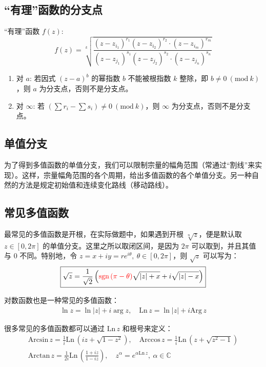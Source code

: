 \documentclass[UTF8]{report}
\def\Arg{\mathrm{Arg}\,}
\def\Ln{\mathrm{Ln\,}}
\def\Arccos{\mathrm{Arccos\,}}
\def\Arcsin{\mathrm{Arcsin\,}}
\def\Arctan{\mathrm{Arctan\,}}
\def\C{\mathbb{C}}
\theoremstyle{MyLineTheoremStyle} %
\theoremstyle{MyBlockTheoremStyle} %
\theoremstyle{MySubsubsectionStyle} %
\begin{document}
\subsection{“有理”函数的分支点}
“有理”函数 $f(z)$: 
\begin{equation}
f(z) = \sqrt[k]{
    \frac{
        (z - z_{i_1})^{r_1}(z - z_{i_2})^{r_2} \cdot (z - z_{i_m})^{r_m}
    }{
        (z - z_{j_1})^{s_1}(z - z_{j_2})^{s_2} \cdot (z - z_{j_n})^{s_n}
    }
}
\end{equation}

\begin{enumerate}
\item 对 $a$: 若因式 $(z - a)^b$ 的幂指数 $b$ {\color{red} 不能}被根指数 $k$ 整除，即 $ b \ne 0\ (\text{mod}\  k) $，则 $a$ 为分支点，否则不是分支点。
\item 对 $\infty$: 若 $(\sum r_i - \sum s_i) \ne 0\ (\text{mod}\  k)$，则 $\infty$ 为分支点，否则不是分支点。
\end{enumerate}

\subsection{单值分支}
为了得到多值函数的单值分支，我们可以限制宗量的幅角范围（常通过“割线”来实现）。这样，宗量幅角范围的各个周期，给出多值函数的各个单值分支。另一种自然的方法是规定初始值和连续变化路线（移动路线）。

\subsection{常见多值函数}
最常见的多值函数是开根，在实际做题中，如果遇到开根 $\sqrt[n]{z} $，便是默认取 $z \in [0, 2\pi]$ 的单值分支。这里之所以取闭区间，是因为 $2\pi$ 可以取到，并且其值与 $0$ 不同。特别地，令 $z = x + iy = re^{i \theta},\ \theta \in [0, 2\pi]$，则 $\sqrt{z}$ 可以写为：
\begin{equation}
\boxed{
    \sqrt{z} =  \frac{1}{\sqrt{2}} \left( {\color{red} \text{sgn\,}(\pi -\theta)} \sqrt{| z | + x} + i \sqrt{| z | - x}  \right)
}
\end{equation}

对数函数也是一种常见的多值函数：
\begin{gather}
    \ln z = \ln | z | + i\arg z,\quad
    \Ln z = \ln | z | + i\Arg z
\end{gather}

很多常见的多值函数都可以通过 $\Ln z$ 和根号来定义：
\begin{gather}
    \Arcsin z = \frac{1}{i}\Ln (iz + \sqrt{1-z^2} ),\quad
    \Arccos z = \frac{1}{i}\Ln (z + \sqrt{z^2 - 1} ) \\
    \Arctan z = \frac{1}{2i}\Ln(\frac{1+iz}{1-iz}) ,\quad
    z^\alpha = e^{\alpha \Ln z},\  \alpha \in \C
\end{gather}
\end{document}
